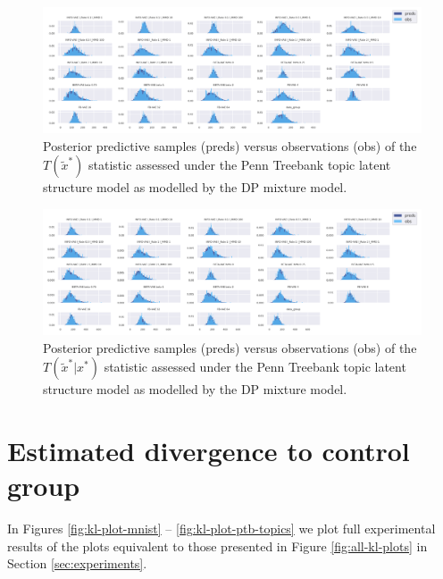 \begin{figure}[!htb]
    \centering
    \includegraphics[width=\textwidth]{images/bda_checks/surprisal_dps/ptb_topics_prediction_checks__unconditional_conditional.png}
    \caption{Posterior predictive samples (preds) versus observations (obs) of the $T(\tilde x^*)$ statistic assessed under the Penn Treebank topic latent structure model as modelled by the DP mixture model.}
    \label{fig:surprisal_check_ptb_topics_uncon_con}
\end{figure}

\begin{figure}[!htb]
    \centering
    \includegraphics[width=\textwidth]{images/bda_checks/surprisal_dps/ptb_topics_prediction_checks__conditional_conditional.png}
    \caption{Posterior predictive samples (preds) versus observations (obs) of the $T(\tilde x^*|x^*)$ statistic assessed under the Penn Treebank topic latent structure model as modelled by the DP mixture model.}
    \label{fig:surprisal_check_ptb_topics_con_con}
\end{figure}

\section{Estimated divergence to control group}\label{app:kl-plots}

In Figures \ref{fig:kl-plot-mnist} -- \ref{fig:kl-plot-ptb-topics} we plot full experimental results of the plots equivalent to those presented in Figure \ref{fig:all-kl-plots} in Section \ref{sec:experiments}.

